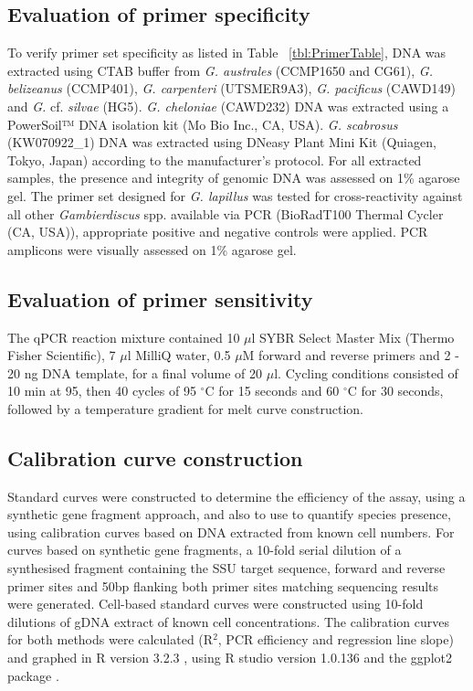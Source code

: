 \documentclass[10pt,letterpaper]{article}
\begin{document}
\subsection*{Evaluation of primer specificity}
To verify primer set specificity as listed in Table ~\ref{tbl:PrimerTable}, DNA was extracted using CTAB buffer \cite{zhou1999analysis} from \emph{G. australes} (CCMP1650 and CG61), \emph{G. belizeanus} (CCMP401), \emph{G. carpenteri} (UTSMER9A3), \emph{G. pacificus} (CAWD149) and \emph{G.} cf. \emph{silvae} (HG5). 
\emph{G. cheloniae} (CAWD232) DNA was extracted using a PowerSoil™ DNA isolation kit (Mo Bio Inc., CA, USA). 
\emph{G. scabrosus} (KW070922\_1) DNA was extracted using DNeasy Plant Mini Kit (Quiagen, Tokyo, Japan) according to the manufacturer's protocol. 
For all extracted samples, the presence and integrity of genomic DNA was assessed on 1\% agarose gel. 
The primer set designed for \emph{G. lapillus} was tested for cross-reactivity against all other \emph{Gambierdiscus} spp. available via PCR (BioRadT100 Thermal Cycler (CA, USA)), appropriate positive and negative controls were applied. 
PCR amplicons were visually assessed on 1\% agarose gel.


\subsection*{Evaluation of primer sensitivity}
The qPCR reaction mixture contained 10 $\mu$l SYBR Select Master Mix (Thermo Fisher Scientific), 7 $\mu$l MilliQ water, 0.5 $\mu$M forward and reverse primers and 2 - 20 ng DNA template, for a final volume of 20 $\mu$l. 
Cycling conditions consisted of 10 min at 95, then 40 cycles of 95 $^{\circ}$C for 15 seconds and 60 $^{\circ}$C for 30 seconds, followed by a temperature gradient for melt curve construction.
\subsection*{Calibration curve construction}
Standard curves were constructed to determine the efficiency of the assay, using a synthetic gene fragment approach, and also to use to quantify species presence, using calibration curves based on DNA extracted from known cell numbers. 
For curves based on synthetic gene fragments, a 10-fold serial dilution of a synthesised fragment containing the SSU target sequence, forward and reverse primer sites and 50bp flanking both primer sites matching sequencing results were generated. 
Cell-based standard curves were constructed using 10-fold dilutions of gDNA extract of known cell concentrations.
The calibration curves for both methods were calculated (R$^{2}$, PCR efficiency and regression line slope) and graphed in R version 3.2.3 \citep{rlang}, using R studio version 1.0.136 \citep{rstudio} and the ggplot2 package \citep{ggplot2}. 
\end{document}
